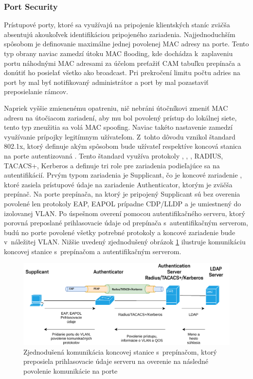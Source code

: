 \subsubsection*{Port Security}
Prístupové porty, ktoré sa využívajú na pripojenie klientských staníc zväčša absentujú akoukoľvek identifikáciou pripojeného zariadenia. Najjednoduchším spôsobom je definovanie maximálne jednej povolenej MAC adresy na porte. Tento typ obrany naviac zamedzí útoku MAC flooding, kde dochádza k~zaplaveniu portu náhodnými MAC adresami za účelom preťažiť CAM tabuľku prepínača a donútiť ho posielať všetko ako broadcast. Pri prekročení limitu počtu adries na port by mal byť notifikovaný administrátor a port by mal pozastaviť preposielanie rámcov.

Napriek vyššie zmienenému opatreniu, nič nebráni útočníkovi zmeniť MAC adresu na útočiacom zariadení, aby mu bol povolený prístup do lokálnej siete, tento typ zneužitia sa volá MAC spoofing. Naviac takéto nastavenie zamedzí využívanie prípojky legitímnym užívateľom. Z~tohto dôvodu vznikol štandard 802.1x, ktorý definuje akým spôsobom bude užívateľ respektíve koncová stanica na porte autentizovaná \cite{Vyncke2008}. Tento štandard využíva protokoly , , , RADIUS, TACACS+, Kerberos a definuje tri role pre zariadenia podieľajúce sa na autentifikácií. Prvým typom zariadenia je Supplicant, čo je koncové zariadenie , ktoré zasiela prístupové údaje na zariadenie Authenticator, ktorým je zväčša prepínač. Na porte prepínača, na ktorý je pripojený Supplicant sú bez overenia povolené len protokoly EAP, EAPOL prípadne CDP/LLDP a je umiestnený do izolovanej VLAN. Po úspešnom overení pomocou autentifikačného serveru, ktorý porovná preposlané prihlasovacie údaje od prepínača s~autentifikačným serverom, budú no porte povolené všetky potrebné protokoly a koncové zariadenie bude v~náležitej VLAN. Nižšie uvedený zjednodušený obrázok \ref{fig:dot1x} ilustruje komunikáciu koncovej stanice s~prepínačom a autentifikačným serverom.  

\begin{figure}[H]
	\begin{center}
		\includegraphics[scale=0.75]{obrazky/dot1x.pdf}
	\end{center}
	\caption[Autentifikácia 802.1x zjednodušene]{Zjednodušená komunikácia koncovej stanice s~prepínačom, ktorý preposiela prihlasovacie údaje serveru na overenie na následné povolenie komunikácie na porte \cite{Vyncke2008}}
	\label{fig:dot1x}
\end{figure}


